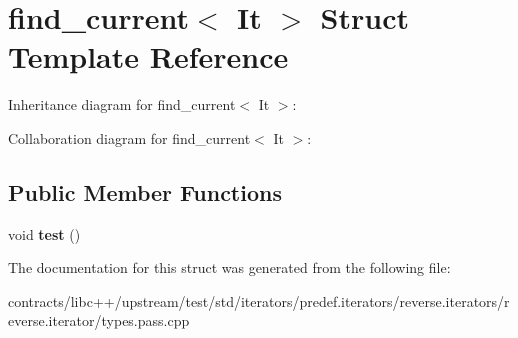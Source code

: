 \hypertarget{structfind__current}{}\section{find\+\_\+current$<$ It $>$ Struct Template Reference}
\label{structfind__current}


Inheritance diagram for find\+\_\+current$<$ It $>$\+:


Collaboration diagram for find\+\_\+current$<$ It $>$\+:
\subsection*{Public Member Functions}
\begin{DoxyCompactItemize}
\item 
\mbox{\label{structfind__current_a35db370082bc034aff847ec55b93e96a}} 
void {\bfseries test} ()
\end{DoxyCompactItemize}


The documentation for this struct was generated from the following file\+:\begin{DoxyCompactItemize}
\item 
contracts/libc++/upstream/test/std/iterators/predef.\+iterators/reverse.\+iterators/reverse.\+iterator/types.\+pass.\+cpp\end{DoxyCompactItemize}

